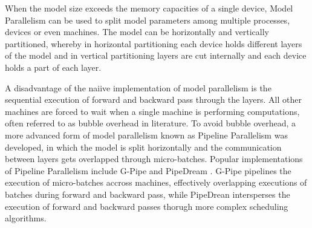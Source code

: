 When the model size exceeds the memory capacities of a single device, Model Parallelism 
\cite*{10.48550/ARXIV.1811.02084, 10.48550/ARXIV.1909.08053} can be used to split model 
parameters among multiple processes, devices or even machines. The model can be horizontally and vertically partitioned, 
whereby in horizontal partitioning each device holds different layers of the model and in vertical partitioning layers 
are cut internally and each device holds a part of each layer.

A disadvantage of the naiive implementation of model parallelism is the sequential execution of forward and backward pass 
through the layers. All other machines are forced to wait when a single machine is performing computations, often referred to 
as bubble overhead in literature. To avoid bubble overhead, a more advanced form of model parallelism known as Pipeline Parallelism
was developed, in which the model is split horizontally and the communication between layers gets overlapped through micro-batches. 
Popular implementations of Pipeline Parallelism include G-Pipe \cite*{10.48550/ARXIV.1811.06965} and 
PipeDream \cite*{10.48550/ARXIV.1806.03377}. G-Pipe pipelines the execution of micro-batches accross machines, 
effectively overlapping executions of batches during forward and backward pass, while PipeDrean intersperses the execution of 
forward and backward passes thorugh more complex scheduling algorithms. 

